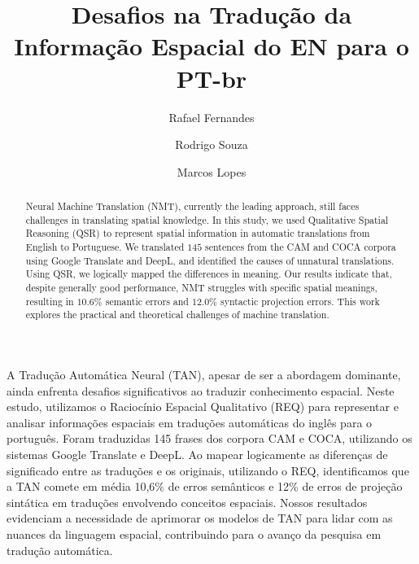 \documentclass[a4paper, twocolumn, 11pt, twoside]{article}
\title{Desafios na Tradução da Informação Espacial do EN para o PT-br}
\author{
  Rafael Fernandes
  \instituto{Universidade de São Paulo}
  \email{rafael.macario@usp.br} 
  \and 
  Rodrigo Souza
 \instituto{Universidade de São Paulo}
  \email{rodrigo.aparecido.souza@usp.br}
  \and
  Marcos Lopes
  \instituto{Universidade de São Paulo}
  \email{marcoslopes@usp.br}
  \and
}
\begin{document}
\setlength{\Exlabelwidth}{0.2em}
\setlength{\SubExleftmargin}{1.5em}

\maketitle

\begin{resumo}
  A Tradução Automática Neural (TAN), apesar de ser a abordagem dominante, ainda enfrenta desafios significativos ao traduzir conhecimento espacial. Neste estudo, utilizamos o Raciocínio Espacial Qualitativo (REQ) para representar e analisar informações espaciais em traduções automáticas do inglês para o português. Foram traduzidas 145 frases dos corpora CAM e COCA, utilizando os sistemas Google Translate e DeepL. Ao mapear logicamente as diferenças de significado entre as traduções e os originais, utilizando o REQ, identificamos que a TAN comete em média 10,6\% de erros semânticos e 12\% de erros de projeção sintática em traduções envolvendo conceitos espaciais. Nossos resultados evidenciam a necessidade de aprimorar os modelos de TAN para lidar com as nuances da linguagem espacial, contribuindo para o avanço da pesquisa em tradução automática.
\end{resumo}


\begin{abstract}
  Neural Machine Translation (NMT), currently the leading approach, still faces challenges in translating spatial knowledge. In this study, we used Qualitative Spatial Reasoning (QSR) to represent spatial information in automatic translations from English to Portuguese. We translated $145$ sentences from the CAM and COCA corpora using Google Translate and DeepL, and identified the causes of unnatural translations. Using QSR, we logically mapped the differences in meaning. Our results indicate that, despite generally good performance, NMT struggles with specific spatial meanings, resulting in $10.6\%$ semantic errors and $12.0\%$ syntactic projection errors. This work explores the practical and theoretical challenges of machine translation.
\end{abstract}
\end{document}

